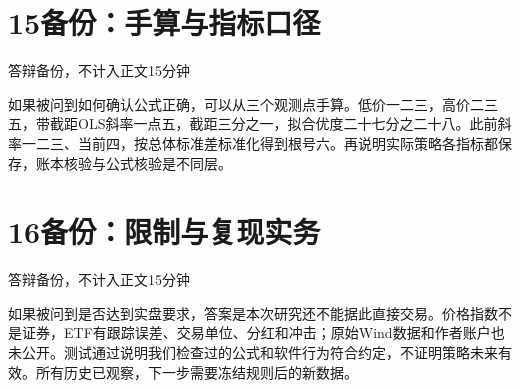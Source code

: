 \documentclass[UTF8,a4paper,11pt]{ctexart}
\begin{document}
\section*{\color{ink}15\quad 备份：手算与指标口径}
{\small\color{accent}答辩备份，不计入正文15分钟}\par
如果被问到如何确认公式正确，可以从三个观测点手算。低价一二三，高价二三五，带截距OLS斜率一点五，截距三分之一，拟合优度二十七分之二十八。此前斜率一二三、当前四，按总体标准差标准化得到根号六。再说明实际策略各指标都保存，账本核验与公式核验是不同层。
\section*{\color{ink}16\quad 备份：限制与复现实务}
{\small\color{accent}答辩备份，不计入正文15分钟}\par
如果被问到是否达到实盘要求，答案是本次研究还不能据此直接交易。价格指数不是证券，ETF有跟踪误差、交易单位、分红和冲击；原始Wind数据和作者账户也未公开。测试通过说明我们检查过的公式和软件行为符合约定，不证明策略未来有效。所有历史已观察，下一步需要冻结规则后的新数据。
\end{document}
